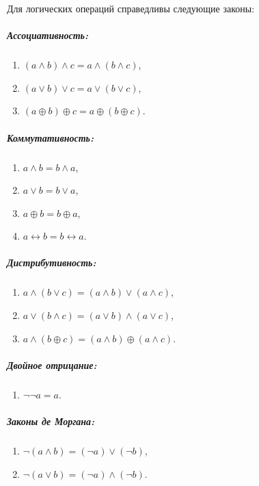 \begin{thm} Для логических операций справедливы следующие законы:

\subparagraph{Ассоциативность:}
\begin{enumerate}
\item $(a \land b) \land c = a \land (b \land c)$,
\item $(a \lor b) \lor c = a \lor (b \lor c)$,
\item $(a \oplus b) \oplus c = a \oplus (b \oplus c)$.
\end{enumerate}

\subparagraph{Коммутативность:}
\begin{enumerate}
\item $a \land b = b \land a$,
\item $a \lor b = b \lor a$,
\item $a \oplus b = b \oplus a$,
\item $a \leftrightarrow b = b \leftrightarrow a$.
\end{enumerate}

\subparagraph{Дистрибутивность:}
\begin{enumerate}
\item $a \land (b \lor c) = (a \land b) \lor (a \land c)$,
\item $a \lor (b \land c) = (a \lor b) \land (a \lor c)$,
\item $a \land (b \oplus c) = (a \land b) \oplus (a \land c)$.
\end{enumerate}

\subparagraph{Двойное отрицание:}
\begin{enumerate}
\item $\neg\neg a = a$.
\end{enumerate}

\subparagraph{Законы де Моргана:}
\begin{enumerate}
\item $\neg (a \land b) = (\neg a) \lor (\neg b)$,
\item $\neg (a \lor b) = (\neg a) \land (\neg b)$.
\end{enumerate}


\end{thm}
